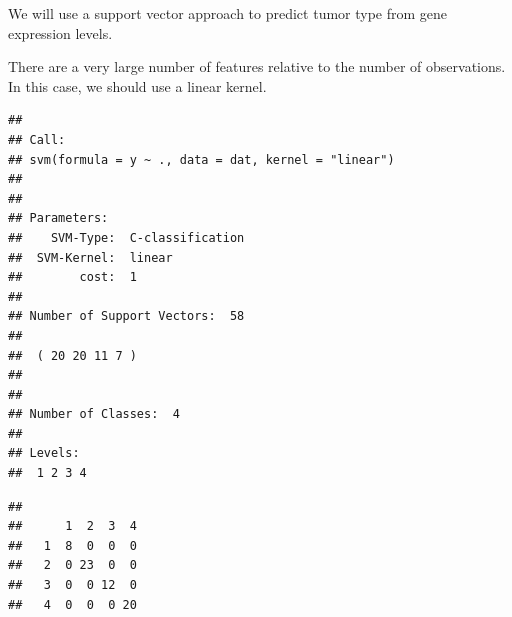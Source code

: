\documentclass[
]{article}
\newenvironment{Shaded}{\begin{snugshade}}{\end{snugshade}}
\newcommand{\AttributeTok}[1]{\textcolor[rgb]{0.77,0.63,0.00}{#1}}
\newcommand{\CommentTok}[1]{\textcolor[rgb]{0.56,0.35,0.01}{\textit{#1}}}
\newcommand{\FunctionTok}[1]{\textcolor[rgb]{0.00,0.00,0.00}{#1}}
\newcommand{\NormalTok}[1]{#1}
\newcommand{\OtherTok}[1]{\textcolor[rgb]{0.56,0.35,0.01}{#1}}
\newcommand{\SpecialCharTok}[1]{\textcolor[rgb]{0.00,0.00,0.00}{#1}}
\newcommand{\StringTok}[1]{\textcolor[rgb]{0.31,0.60,0.02}{#1}}
\begin{document}
We will use a support vector approach to predict tumor type from gene
expression levels.

There are a very large number of features relative to the number of
observations. In this case, we should use a linear kernel.

\begin{Shaded}
\end{Shaded}

\begin{verbatim}
## 
## Call:
## svm(formula = y ~ ., data = dat, kernel = "linear")
## 
## 
## Parameters:
##    SVM-Type:  C-classification 
##  SVM-Kernel:  linear 
##        cost:  1 
## 
## Number of Support Vectors:  58
## 
##  ( 20 20 11 7 )
## 
## 
## Number of Classes:  4 
## 
## Levels: 
##  1 2 3 4
\end{verbatim}

\begin{Shaded}
\end{Shaded}

\begin{verbatim}
##    
##      1  2  3  4
##   1  8  0  0  0
##   2  0 23  0  0
##   3  0  0 12  0
##   4  0  0  0 20
\end{verbatim}
\end{document}
